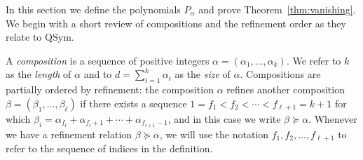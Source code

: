 \documentclass[submission]{FPSAC2024}
\theoremstyle{definition}
\theoremstyle{remark}
\numberwithin{equation}{section}
\newcommand{\QSym}{\mathrm{QSym}}
\begin{document}
In this section we define the polynomials $P_{\alpha}$ and prove Theorem~\ref{thm:vanishing}.  We begin with a short review of compositions and the refinement order as they relate to $\QSym$.  

A \emph{composition} is a sequence of positive integers $\alpha = (\alpha_{1}, \ldots, \alpha_{k})$.  We refer to $k$ as the \emph{length} of $\alpha$ and to $d = \sum_{i = 1}^{k} \alpha_{i}$ as the \emph{size} of $\alpha$.  Compositions are partially ordered by refinement: the composition $\alpha$ refines another composition $\beta = (\beta_{1}, \ldots, \beta_{\ell})$ if there exists a sequence $1 = f_{1} < f_{2} < \cdots < f_{\ell + 1} = k+1$ for which $\beta_{i} = \alpha_{f_{i}} + \alpha_{f_{i} + 1} + \cdots + \alpha_{f_{i+1} - 1}$, and in this case we write $\beta \succeq \alpha$.  Whenever we have a refinement relation $\beta \succeq \alpha$, we will use the notation $f_{1}, f_{2}, \ldots, f_{\ell+1}$ to refer to the sequence of indices in the definition.
\end{document}
